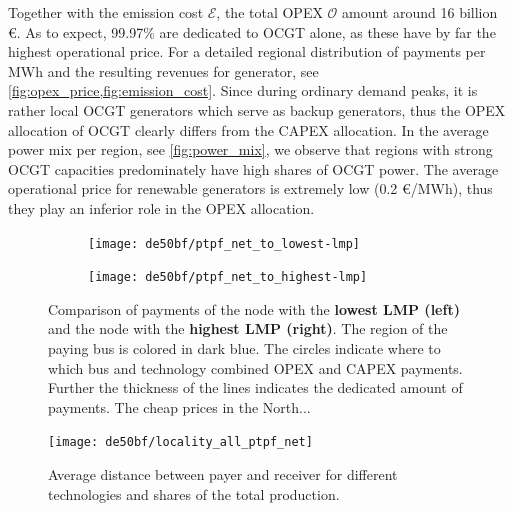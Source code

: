 \documentclass[11pt,twocolumn]{article}
\newcommand{\opex}{\mathcal{O}}
\newcommand{\emissioncost}{\mathcal{E}}
\begin{document}
Together with the emission cost $\emissioncost$, the total OPEX $\opex$ amount around 16 billion \euro. As to expect, 99.97\% are dedicated to OCGT alone, as these have by far the highest operational price. For a detailed regional distribution of payments per MWh and the resulting revenues for generator, see \cref{fig:opex_price,fig:emission_cost}. Since during ordinary demand peaks, it is rather local OCGT generators which serve as backup generators, thus the OPEX allocation of OCGT clearly differs from the CAPEX allocation. In the average power mix per region, see \cref{fig:power_mix}, we observe that regions with strong OCGT capacities predominately have high shares of OCGT power. The average operational price for renewable generators is extremely low (0.2 \euro/MWh), thus they play an inferior role in the OPEX allocation. \\

\begin{figure}
    \centering
    \begin{subfigure}[c]{.6\linewidth}
    \texttt{[image: de50bf/ptpf\_net\_to\_lowest-lmp]}
    \end{subfigure}
    \hspace{-.2151\linewidth}
    \begin{subfigure}[c]{.6\linewidth}
    \texttt{[image: de50bf/ptpf\_net\_to\_highest-lmp]}
    \end{subfigure}
    \caption{Comparison of payments of the node with the \textbf{lowest LMP (left)} and the node with the \textbf{highest LMP (right)}. The region of the paying bus is colored in dark blue. The circles indicate where to which bus and technology combined OPEX and CAPEX payments. Further the thickness of the lines indicates the dedicated amount of payments. The cheap prices in the North...  }
    \label{fig:direct-allocation}
\end{figure}


\begin{figure}
    \centering
    \texttt{[image: de50bf/locality\_all\_ptpf\_net]}
    \caption{Average distance between payer and receiver for different technologies and shares of the total production.}
    \label{fig:locality}
\end{figure}
\end{document}
